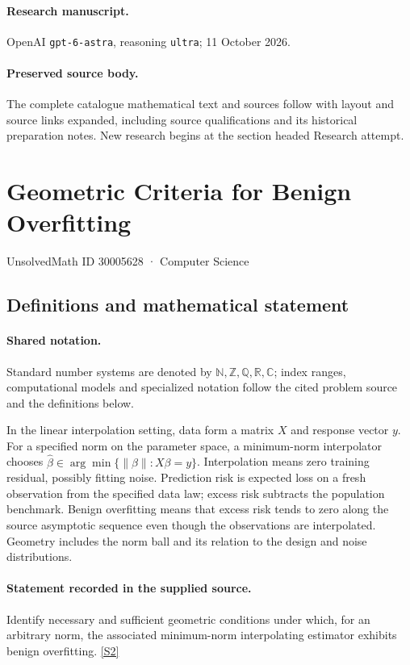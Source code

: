 \documentclass[11pt]{article}
\begin{document}
\paragraph{Research manuscript.} OpenAI \texttt{gpt-6-astra}, reasoning \texttt{ultra}; 11 October 2026.
\paragraph{Preserved source body.} The complete catalogue mathematical text and sources follow with layout and source links expanded, including source qualifications and its historical preparation notes. New research begins at the section headed Research attempt.

\section{Geometric Criteria for Benign Overfitting}\label{30005628}
{\small UnsolvedMath ID 30005628 · Computer Science}
\subsection{Definitions and mathematical statement}

\paragraph{Shared notation.}Standard number systems are denoted by $\mathbb N,\mathbb Z,\mathbb Q,\mathbb R,\mathbb C$; index ranges, computational models and specialized notation follow the cited problem source and the definitions below.


In the linear interpolation setting, data form a matrix $X$ and response vector $y$. For a specified norm on the parameter space, a minimum-norm interpolator chooses $\widehat\beta\in\arg\min\{\lVert\beta\rVert:X\beta=y\}$. Interpolation means zero training residual, possibly fitting noise. Prediction risk is expected loss on a fresh observation from the specified data law; excess risk subtracts the population benchmark. Benign overfitting means that excess risk tends to zero along the source asymptotic sequence even though the observations are interpolated. Geometry includes the norm ball and its relation to the design and noise distributions.
\paragraph{Statement recorded in the supplied source.}
Identify necessary and sufficient geometric conditions under which, for an arbitrary norm, the associated minimum-norm interpolating estimator exhibits benign overfitting. \href{https://doi.org/10.4171/owr/2023/41}{[S2]}
\end{document}
